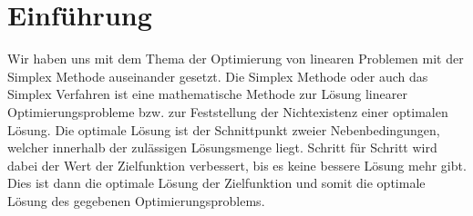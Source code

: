 \section{Einführung}

Wir haben uns mit dem Thema der Optimierung von linearen Problemen mit der Simplex Methode auseinander gesetzt.
Die Simplex Methode oder auch das Simplex Verfahren ist eine mathematische Methode zur Lösung linearer Optimierungsprobleme bzw. zur Feststellung der Nichtexistenz einer optimalen Lösung. Die optimale Lösung ist der Schnittpunkt zweier Nebenbedingungen, welcher innerhalb der zulässigen Lösungsmenge liegt.
Schritt für Schritt wird dabei der Wert der Zielfunktion verbessert, bis es keine bessere Lösung mehr gibt. Dies ist dann die optimale Lösung der Zielfunktion und somit die optimale Lösung des gegebenen Optimierungsproblems.











